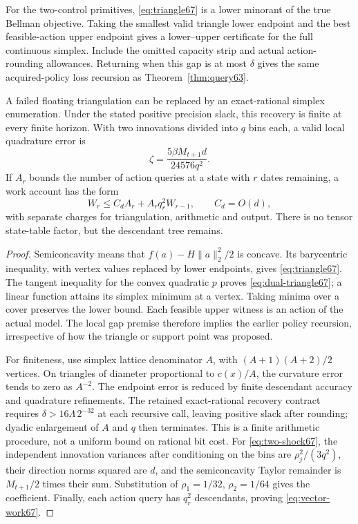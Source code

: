 \begin{theorem}\label{thm:vector67}
For the two-control primitives, \eqref{eq:triangle67} is a lower minorant of the true Bellman objective. Taking the smallest valid triangle lower endpoint and the best feasible-action upper endpoint gives a lower--upper certificate for the full continuous simplex. Include the omitted capacity strip and actual action-rounding allowances. Returning when this gap is at most $\delta$ gives the same acquired-policy loss recursion as Theorem~\ref{thm:query63}.

A failed floating triangulation can be replaced by an exact-rational simplex enumeration. Under the stated positive precision slack, this recovery is finite at every finite horizon. With two innovations divided into $q$ bins each, a valid local quadrature error is
\begin{equation}\label{eq:two-shock67}
 \zeta=\frac{5\beta M_{t+1}d}{24576q^2}.
\end{equation}
If $A_r$ bounds the number of action queries at a state with $r$ dates remaining, a work account has the form
\begin{equation}\label{eq:vector-work67}
 W_r\le C_d A_r+A_rq_r^2W_{r-1},\qquad C_d=O(d),
\end{equation}
with separate charges for triangulation, arithmetic and output. There is no tensor state-table factor, but the descendant tree remains.
\end{theorem}
\begin{proof}
Semiconcavity means that $f(a)-H\|a\|_2^2/2$ is concave. Its barycentric inequality, with vertex values replaced by lower endpoints, gives \eqref{eq:triangle67}. The tangent inequality for the convex quadratic $p$ proves \eqref{eq:dual-triangle67}; a linear function attains its simplex minimum at a vertex. Taking minima over a cover preserves the lower bound. Each feasible upper witness is an action of the actual model. The local gap premise therefore implies the earlier policy recursion, irrespective of how the triangle or support point was proposed.

For finiteness, use simplex lattice denominator $A$, with $(A+1)(A+2)/2$ vertices. On triangles of diameter proportional to $c(x)/A$, the curvature error tends to zero as $A^{-2}$. The endpoint error is reduced by finite descendant accuracy and quadrature refinements. The retained exact-rational recovery contract requires $\delta>16\Lambda\,2^{-32}$ at each recursive call, leaving positive slack after rounding; dyadic enlargement of $A$ and $q$ then terminates. This is a finite arithmetic procedure, not a uniform bound on rational bit cost. For \eqref{eq:two-shock67}, the independent innovation variances after conditioning on the bins are $\rho_j^2/(3q^2)$, their direction norms squared are $d$, and the semiconcavity Taylor remainder is $M_{t+1}/2$ times their sum. Substitution of $\rho_1=1/32$, $\rho_2=1/64$ gives the coefficient. Finally, each action query has $q_r^2$ descendants, proving \eqref{eq:vector-work67}.
\end{proof}

